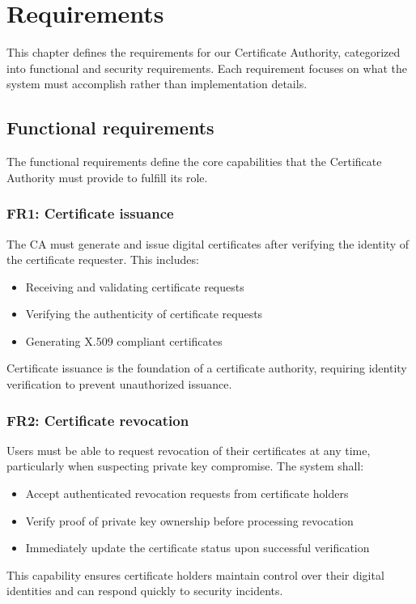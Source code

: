 \chapter{Requirements}

This chapter defines the requirements for our Certificate Authority, 
categorized into functional and security requirements. Each requirement focuses 
on what the system must accomplish rather than implementation details.

\section{Functional requirements}

The functional requirements define the core capabilities that the Certificate 
Authority must provide to fulfill its role.

\subsection{FR1: Certificate issuance}

The CA must generate and issue digital certificates after verifying the 
identity of the certificate requester. This includes:

\begin{itemize}
    \item Receiving and validating certificate requests
    \item Verifying the authenticity of certificate requests
    \item Generating X.509 compliant certificates
\end{itemize}
Certificate issuance is the foundation of a certificate authority, 
requiring identity verification to prevent unauthorized issuance.

\subsection{FR2: Certificate revocation}

Users must be able to request revocation of their certificates at any time, 
particularly when suspecting private key compromise. The system shall:

\begin{itemize}
    \item Accept authenticated revocation requests from certificate holders
    \item Verify proof of private key ownership before processing revocation
    \item Immediately update the certificate status upon successful verification
\end{itemize}
This capability ensures certificate holders maintain control over their 
digital identities and can respond quickly to security incidents.

